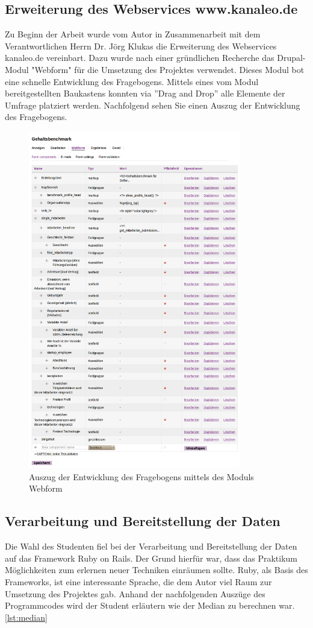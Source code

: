 \subsection{Erweiterung des Webservices www.kanaleo.de}
Zu Beginn der Arbeit wurde vom Autor in Zusammenarbeit mit dem Verantwortlichen
Herrn Dr. Jörg Klukas die Erweiterung des Webservices kanaleo.de
vereinbart. Dazu wurde nach einer gründlichen Recherche das Drupal-Modul
"Webform" für die Umsetzung des Projektes verwendet. Dieses Modul bot eine
schnelle Entwicklung des Fragebogens. Mittels eines vom Modul bereitgestellten
Baukastens konnten via ''Drag and Drop'' alle Elemente der Umfrage platziert
werden. Nachfolgend sehen Sie einen Auszug der Entwicklung des
Fragebogens.
\begin{figure}[htbp]
 \centering
 \includegraphics[width=350px]{./material/gehaltsformedit.png}
 \caption{Auszug der Entwicklung des Fragebogens mittels des Moduls Webform}
 \label{fig: Fragebogen edit}
\end{figure}
\newpage
\subsection{Verarbeitung und Bereitstellung der Daten}
Die Wahl des Studenten fiel bei der Verarbeitung und Bereitstellung der Daten
auf das Framework Ruby on Rails. Der Grund hierfür war, dass das Praktikum
Möglichkeiten zum erlernen neuer Techniken einräumen sollte. Ruby, als Basis
des Frameworks, ist eine interessante Sprache, die dem Autor viel Raum zur
Umsetzung des Projektes gab. Anhand der nachfolgenden Auszüge des Programmcodes
wird der Student erläutern wie der Median zu berechnen war. \ref{lst:median}

